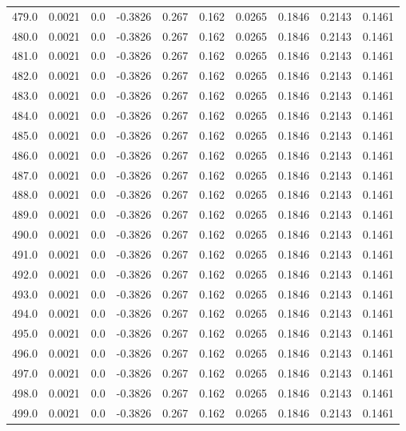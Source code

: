 \begin{longtable}{lrrrrrrrrr}
479.0 & 0.0021 & 0.0 & -0.3826 & 0.267 & 0.162 & 0.0265 & 0.1846 & 0.2143 & 0.1461 \\
480.0 & 0.0021 & 0.0 & -0.3826 & 0.267 & 0.162 & 0.0265 & 0.1846 & 0.2143 & 0.1461 \\
481.0 & 0.0021 & 0.0 & -0.3826 & 0.267 & 0.162 & 0.0265 & 0.1846 & 0.2143 & 0.1461 \\
482.0 & 0.0021 & 0.0 & -0.3826 & 0.267 & 0.162 & 0.0265 & 0.1846 & 0.2143 & 0.1461 \\
483.0 & 0.0021 & 0.0 & -0.3826 & 0.267 & 0.162 & 0.0265 & 0.1846 & 0.2143 & 0.1461 \\
484.0 & 0.0021 & 0.0 & -0.3826 & 0.267 & 0.162 & 0.0265 & 0.1846 & 0.2143 & 0.1461 \\
485.0 & 0.0021 & 0.0 & -0.3826 & 0.267 & 0.162 & 0.0265 & 0.1846 & 0.2143 & 0.1461 \\
486.0 & 0.0021 & 0.0 & -0.3826 & 0.267 & 0.162 & 0.0265 & 0.1846 & 0.2143 & 0.1461 \\
487.0 & 0.0021 & 0.0 & -0.3826 & 0.267 & 0.162 & 0.0265 & 0.1846 & 0.2143 & 0.1461 \\
488.0 & 0.0021 & 0.0 & -0.3826 & 0.267 & 0.162 & 0.0265 & 0.1846 & 0.2143 & 0.1461 \\
489.0 & 0.0021 & 0.0 & -0.3826 & 0.267 & 0.162 & 0.0265 & 0.1846 & 0.2143 & 0.1461 \\
490.0 & 0.0021 & 0.0 & -0.3826 & 0.267 & 0.162 & 0.0265 & 0.1846 & 0.2143 & 0.1461 \\
491.0 & 0.0021 & 0.0 & -0.3826 & 0.267 & 0.162 & 0.0265 & 0.1846 & 0.2143 & 0.1461 \\
492.0 & 0.0021 & 0.0 & -0.3826 & 0.267 & 0.162 & 0.0265 & 0.1846 & 0.2143 & 0.1461 \\
493.0 & 0.0021 & 0.0 & -0.3826 & 0.267 & 0.162 & 0.0265 & 0.1846 & 0.2143 & 0.1461 \\
494.0 & 0.0021 & 0.0 & -0.3826 & 0.267 & 0.162 & 0.0265 & 0.1846 & 0.2143 & 0.1461 \\
495.0 & 0.0021 & 0.0 & -0.3826 & 0.267 & 0.162 & 0.0265 & 0.1846 & 0.2143 & 0.1461 \\
496.0 & 0.0021 & 0.0 & -0.3826 & 0.267 & 0.162 & 0.0265 & 0.1846 & 0.2143 & 0.1461 \\
497.0 & 0.0021 & 0.0 & -0.3826 & 0.267 & 0.162 & 0.0265 & 0.1846 & 0.2143 & 0.1461 \\
498.0 & 0.0021 & 0.0 & -0.3826 & 0.267 & 0.162 & 0.0265 & 0.1846 & 0.2143 & 0.1461 \\
499.0 & 0.0021 & 0.0 & -0.3826 & 0.267 & 0.162 & 0.0265 & 0.1846 & 0.2143 & 0.1461 \\

\end{longtable}
